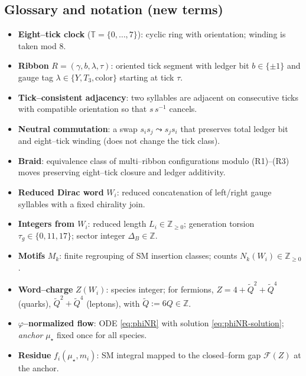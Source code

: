 \documentclass[epjc3]{svjour3}
\begin{document}
\subsection*{Glossary and notation (new terms)}
\begin{itemize}
  \item \textbf{Eight--tick clock} ($\mathbb T=\{0,\dots,7\}$): cyclic ring with orientation; winding is taken mod $8$.
  \item \textbf{Ribbon} $R=(\gamma,b,\lambda,\tau)$: oriented tick segment with ledger bit $b\in\{\pm1\}$ and gauge tag $\lambda\in\{Y,T_3,\text{color}\}$ starting at tick $\tau$.
  \item \textbf{Tick--consistent adjacency}: two syllables are adjacent on consecutive ticks with compatible orientation so that $s\,s^{-1}$ cancels.
  \item \textbf{Neutral commutation}: a swap $s_is_j\leadsto s_js_i$ that preserves total ledger bit and eight--tick winding (does not change the tick class).
  \item \textbf{Braid}: equivalence class of multi--ribbon configurations modulo (R1)--(R3) moves preserving eight--tick closure and ledger additivity.
  \item \textbf{Reduced Dirac word} $W_i$: reduced concatenation of left/right gauge syllables with a fixed chirality join.
  \item \textbf{Integers from $W_i$}: reduced length $L_i\in\mathbb Z_{\ge0}$; generation torsion $\tau_g\in\{0,11,17\}$; sector integer $\Delta_B\in\mathbb Z$.
  \item \textbf{Motifs} $M_k$: finite regrouping of SM insertion classes; counts $N_k(W_i)\in\mathbb Z_{\ge0}$.
  \item \textbf{Word--charge} $Z(W_i)$: species integer; for fermions, $Z=4+\tilde Q^2+\tilde Q^4$ (quarks), $\tilde Q^2+\tilde Q^4$ (leptons), with $\tilde Q:=6Q\in\mathbb Z$.
  \item \textbf{$\varphi$--normalized flow}: ODE \eqref{eq:phiNR} with solution \eqref{eq:phiNR-solution}; \emph{anchor} $\mu_\star$ fixed once for all species.
  \item \textbf{Residue} $f_i(\mu_\star,m_i)$: SM integral mapped to the closed--form gap $\mathcal F(Z)$ at the anchor.
\end{itemize}
\end{document}
